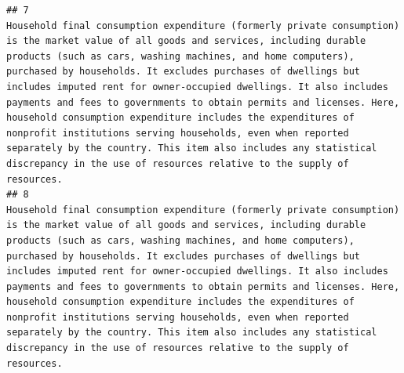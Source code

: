 \documentclass[
]{article}
\begin{document}
\begin{verbatim}
## 7                                                                                                                                                                                                                                                                                                                                                                                                                                                                                                                                                                                                                                                                                                                                                        Household final consumption expenditure (formerly private consumption) is the market value of all goods and services, including durable products (such as cars, washing machines, and home computers), purchased by households. It excludes purchases of dwellings but includes imputed rent for owner-occupied dwellings. It also includes payments and fees to governments to obtain permits and licenses. Here, household consumption expenditure includes the expenditures of nonprofit institutions serving households, even when reported separately by the country. This item also includes any statistical discrepancy in the use of resources relative to the supply of resources.
## 8                                                                                                                                                                                                                                                                                                                                                                                                                                                                                                                                                                                                                                                                                                                                                        Household final consumption expenditure (formerly private consumption) is the market value of all goods and services, including durable products (such as cars, washing machines, and home computers), purchased by households. It excludes purchases of dwellings but includes imputed rent for owner-occupied dwellings. It also includes payments and fees to governments to obtain permits and licenses. Here, household consumption expenditure includes the expenditures of nonprofit institutions serving households, even when reported separately by the country. This item also includes any statistical discrepancy in the use of resources relative to the supply of resources.

\end{verbatim}
\end{document}

